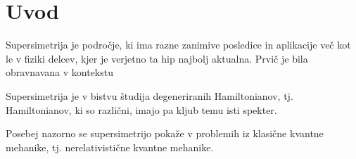 \section{Uvod}

Supersimetrija je podro\v cje, ki ima razne zanimive posledice in aplikacije ve\v c kot le v fiziki
delcev, kjer je verjetno ta hip najbolj aktualna. Prvi\v c je bila obravnavana v kontekstu 

Supersimetrija je v bistvu \v studija degeneriranih Hamiltonianov, tj. Hamiltonianov, ki so
razli\v cni, imajo pa kljub temu isti spekter.

Posebej nazorno se supersimetrijo poka\v ze v problemih iz klasi\v cne kvantne mehanike, tj.
nerelativisti\v cne kvantne mehanike.
